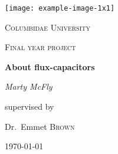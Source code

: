 \begin{titlingpage}
	\centering
	\texttt{[image: example-image-1x1]}\par\vspace{1cm}
	{\scshape\LARGE Columbidae University \par}
	\vspace{1cm}
	{\scshape\Large Final year project\par}
	\vspace{1.5cm}
	{\huge\bfseries About flux-capacitors\par}
	\vspace{2cm}
	{\Large\itshape Marty McFly\par}
	\vfill
	supervised by\par
	Dr.~Emmet \textsc{Brown}
	
	\vfill
	
	{\large \today\par}
\end{titlingpage}